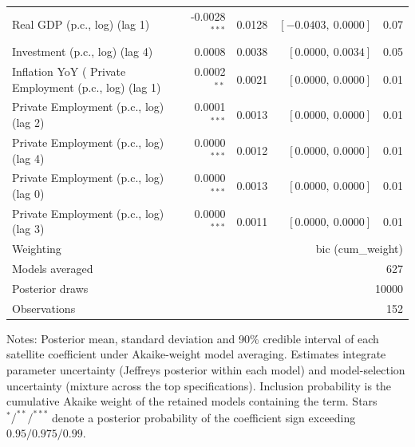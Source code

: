 \begin{table}[!htbp]
\begin{tabular}{lrrrr}
Real GDP (p.c., log) (lag 1) & -0.0028$^{***}$ & 0.0128 & $[-0.0403,\ 0.0000]$ & 0.07 \\
Investment (p.c., log) (lag 4) & 0.0008 & 0.0038 & $[0.0000,\ 0.0034]$ & 0.05 \\
Inflation YoY (%
Private Employment (p.c., log) (lag 1) & 0.0002$^{**}$ & 0.0021 & $[0.0000,\ 0.0000]$ & 0.01 \\
Private Employment (p.c., log) (lag 2) & 0.0001$^{***}$ & 0.0013 & $[0.0000,\ 0.0000]$ & 0.01 \\
Private Employment (p.c., log) (lag 4) & 0.0000$^{***}$ & 0.0012 & $[0.0000,\ 0.0000]$ & 0.01 \\
Private Employment (p.c., log) (lag 0) & 0.0000$^{***}$ & 0.0013 & $[0.0000,\ 0.0000]$ & 0.01 \\
Private Employment (p.c., log) (lag 3) & 0.0000$^{***}$ & 0.0011 & $[0.0000,\ 0.0000]$ & 0.01 \\
\midrule
Weighting & \multicolumn{4}{r}{bic (cum_weight)} \\
Models averaged & \multicolumn{4}{r}{627} \\
Posterior draws & \multicolumn{4}{r}{10000} \\
Observations & \multicolumn{4}{r}{152} \\
\bottomrule
\end{tabular}
\begin{tablenotes}\small
\item Notes: Posterior mean, standard deviation and 90\% credible interval of each satellite coefficient under Akaike-weight model averaging. Estimates integrate parameter uncertainty (Jeffreys posterior within each model) and model-selection uncertainty (mixture across the top specifications). Inclusion probability is the cumulative Akaike weight of the retained models containing the term. Stars $^{*}/^{**}/^{***}$ denote a posterior probability of the coefficient sign exceeding $0.95/0.975/0.99$.
\end{tablenotes}
\end{table}
